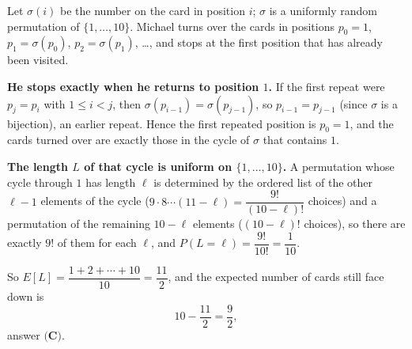 Let $\sigma(i)$ be the number on the card in position $i$; $\sigma$ is a uniformly random permutation of $\{1,\dots,10\}$. Michael turns over the cards in positions $p_0=1$, $p_1=\sigma(p_0)$, $p_2=\sigma(p_1)$, \dots, and stops at the first position that has already been visited.

\textbf{He stops exactly when he returns to position $1$.} If the first repeat were $p_j=p_i$ with $1\le i<j$, then $\sigma(p_{i-1})=\sigma(p_{j-1})$, so $p_{i-1}=p_{j-1}$ (since $\sigma$ is a bijection), an earlier repeat. Hence the first repeated position is $p_0=1$, and the cards turned over are exactly those in the cycle of $\sigma$ that contains $1$.

\textbf{The length $L$ of that cycle is uniform on $\{1,\dots,10\}$.} A permutation whose cycle through $1$ has length $\ell$ is determined by the ordered list of the other $\ell-1$ elements of the cycle ($9\cdot8\cdots(11-\ell)=\dfrac{9!}{(10-\ell)!}$ choices) and a permutation of the remaining $10-\ell$ elements ($(10-\ell)!$ choices), so there are exactly $9!$ of them for each $\ell$, and $P(L=\ell)=\dfrac{9!}{10!}=\dfrac{1}{10}$.

So $E[L]=\dfrac{1+2+\cdots+10}{10}=\dfrac{11}{2}$, and the expected number of cards still face down is
\[10-\dfrac{11}{2}=\boxed{\dfrac{9}{2}},\]
answer $\textbf{(C)}$.
